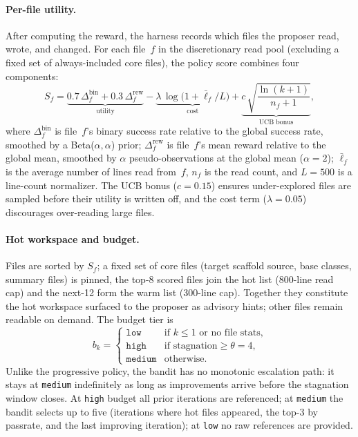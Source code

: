 \paragraph{Per-file utility.}
After computing the reward, the harness records which files the proposer
read, wrote, and changed. For each file~$f$ in the discretionary read
pool (excluding a fixed set of always-included core files), the
policy score combines four components:
\begin{equation}
  S_f = \underbrace{0.7\,\Delta_f^{\text{bin}}
        + 0.3\,\Delta_f^{\text{rew}}}_{\text{utility}}
        - \underbrace{\lambda\,\log\!\bigl(1 + \bar\ell_f / L\bigr)}_{\text{cost}}
        + \underbrace{c\,\sqrt{\frac{\ln(k+1)}{n_f+1}}}_{\text{UCB bonus}},
  \label{eq:policy_score}
\end{equation}
where $\Delta_f^{\text{bin}}$ is file~$f$'s binary success rate
relative to the global success rate, smoothed by a
Beta($\alpha,\alpha$) prior; $\Delta_f^{\text{rew}}$ is file~$f$'s
mean reward relative to the global mean, smoothed by $\alpha$
pseudo-observations at the global mean ($\alpha\!=\!2$);
$\bar\ell_f$ is the average number of lines read from~$f$, $n_f$ is
the read count, and $L\!=\!500$ is a line-count normalizer. The UCB
bonus ($c\!=\!0.15$) ensures under-explored files are sampled before
their utility is written off, and the cost term ($\lambda\!=\!0.05$)
discourages over-reading large files.

\paragraph{Hot workspace and budget.}
Files are sorted by $S_f$; a fixed set of core files (target
scaffold source, base classes, summary files) is pinned, the top-8
scored files join the hot list (800-line read cap) and the
next-12 form the warm list (300-line cap). Together they constitute
the hot workspace surfaced to the proposer as advisory hints; other
files remain readable on demand. The budget tier is
\begin{equation}
  b_k =
  \begin{cases}
    \texttt{low}    & \text{if } k\!\le\!1 \text{ or no file stats,} \\
    \texttt{high}   & \text{if stagnation} \ge \theta\!=\!4, \\
    \texttt{medium} & \text{otherwise.}
  \end{cases}
  \label{eq:bandit_budget}
\end{equation}
Unlike the progressive policy, the bandit has no monotonic escalation
path: it stays at \texttt{medium} indefinitely as long as improvements
arrive before the stagnation window closes. At \texttt{high} budget
all prior iterations are referenced; at \texttt{medium} the bandit
selects up to five (iterations where hot files appeared, the top-3 by
passrate, and the last improving iteration); at \texttt{low} no raw
references are provided.

